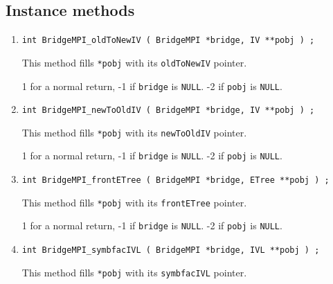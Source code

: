\subsection{Instance methods}
\label{subsection:BridgeMPI:proto:instance}
\par
\begin{enumerate}
\item
\begin{verbatim}
int BridgeMPI_oldToNewIV ( BridgeMPI *bridge, IV **pobj ) ;
\end{verbatim}
This method fills \texttt{*pobj} with its \texttt{oldToNewIV} pointer.
\par {}
1 for a normal return, 
-1 if \texttt{bridge} is \texttt{NULL}.
-2 if \texttt{pobj} is \texttt{NULL}.
\item
\begin{verbatim}
int BridgeMPI_newToOldIV ( BridgeMPI *bridge, IV **pobj ) ;
\end{verbatim}
This method fills \texttt{*pobj} with its \texttt{newToOldIV} pointer.
\par {}
1 for a normal return, 
-1 if \texttt{bridge} is \texttt{NULL}.
-2 if \texttt{pobj} is \texttt{NULL}.
\item
\begin{verbatim}
int BridgeMPI_frontETree ( BridgeMPI *bridge, ETree **pobj ) ;
\end{verbatim}
This method fills \texttt{*pobj} with its \texttt{frontETree} pointer.
\par {}
1 for a normal return, 
-1 if \texttt{bridge} is \texttt{NULL}.
-2 if \texttt{pobj} is \texttt{NULL}.
\item
\begin{verbatim}
int BridgeMPI_symbfacIVL ( BridgeMPI *bridge, IVL **pobj ) ;
\end{verbatim}
This method fills \texttt{*pobj} with its \texttt{symbfacIVL} pointer.

\end{enumerate}
